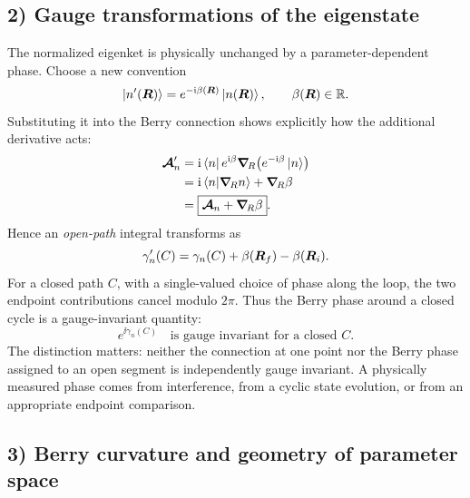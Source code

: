 \subsection*{2) Gauge transformations of the eigenstate}

The normalized eigenket is physically unchanged by a parameter-dependent phase. Choose a new convention
\begin{equation}
\left|n'(\bm{R})\right\rangle=e^{-\mathrm{i}\beta(\bm{R})}\left|n(\bm{R})\right\rangle,\qquad
 \beta(\bm{R})\in\mathbb R.
\end{equation}
Substituting it into the Berry connection shows explicitly how the additional derivative acts:
\begin{equation}
\begin{aligned}
\bm{\mathcal A}'_n
 &=\mathrm{i}\left\langle n\right| e^{\mathrm{i}\beta}\bm{\nabla}_{\!R}
    \bigl(e^{-\mathrm{i}\beta}\left|n\right\rangle\bigr)\\
 &=\mathrm{i}\left\langle n\middle|\bm{\nabla}_{\!R}n\right\rangle
       +\bm{\nabla}_{\!R}\beta\\
 &=\boxed{\bm{\mathcal A}_n+\bm{\nabla}_{\!R}\beta}.
\end{aligned}
\end{equation}
Hence an \emph{open-path} integral transforms as
\begin{equation}
\gamma_n'(C)=\gamma_n(C)+\beta(\bm{R}_f)-\beta(\bm{R}_i).
\end{equation}
For a closed path $C$, with a single-valued choice of phase along the loop, the two endpoint contributions cancel modulo $2\pi$. Thus the Berry phase around a closed cycle is a gauge-invariant quantity:
\begin{equation}
\boxed{e^{\ii\gamma_n(C)}\quad\text{is gauge invariant for a closed }C.}
\end{equation}
The distinction matters: neither the connection at one point nor the Berry phase assigned to an open segment is independently gauge invariant. A physically measured phase comes from interference, from a cyclic state evolution, or from an appropriate endpoint comparison.

\subsection*{3) Berry curvature and geometry of parameter space}


